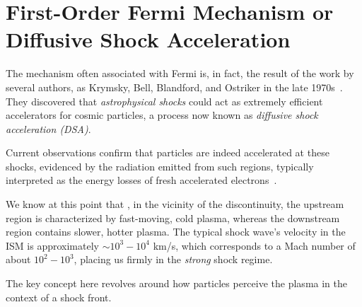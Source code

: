 \section{First-Order Fermi Mechanism or Diffusive Shock Acceleration}

The mechanism often associated with Fermi is, in fact, the result of the work by several authors, as Krymsky, Bell, Blandford, and Ostriker in the late 1970s~\cite{addref}. 
%
%
They discovered that \emph{astrophysical shocks} could act as extremely efficient accelerators for cosmic particles, a process now known as \emph{diffusive shock acceleration (DSA)}.

Current observations confirm that particles are indeed accelerated at these shocks, evidenced by the radiation emitted from such regions, typically interpreted as the energy losses of fresh accelerated electrons~\cite{ref}. 

We know at this point that , in the vicinity of the discontinuity, the upstream region is characterized by fast-moving, cold plasma, whereas the downstream region contains slower, hotter plasma. 
%
The typical shock wave's velocity in the ISM is approximately \( \sim 10^3-10^4 \) km/s, which corresponds to a Mach number of about \( 10^2-10^3 \), placing us firmly in the \emph{strong} shock regime.

The key concept here revolves around how particles perceive the plasma in the context of a shock front. 

